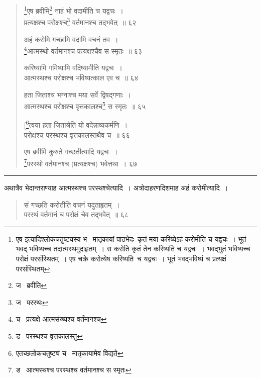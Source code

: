 \documentclass[11pt, openany]{book}
\begin{document}
{ 

\newpage

\lfoot{}

\begin{quote}
 {\na \renewcommand{\thefootnote}{1}\footnote{एष इत्यादिश्लोकचतुष्टयस्य भ \textendash\ मातृकायां पाठभेदः\textendash\ कृतं मया करिष्येऽहं करोमीति च यद्वचः~। भूतं भवद् भविष्यच्च तदात्मस्थमुदाहृतम्~। स करोति कृतं तेन करिष्यति च यद्वचः~। भवद्भुतं भविष्यच्च परोक्षं परसंस्थितम्~। एष चक्रे करोत्येष करिष्यति\textendash\ च यद्वचः~। भूतं भवद्भविष्यं च प्रत्यक्षं परसंस्थितम्}एष ब्रवीमि\renewcommand{\thefootnote}{2}\footnote{ज \textendash\ ब्रवीति} नाहं भो वदामीति च यद्वचः~। \\
प्रत्यक्षश्च परोक्षश्च\renewcommand{\thefootnote}{3}\footnote{ज \textendash\ परस्थः} वर्तमानश्च तद्भवेत्~॥ ६२ 

अहं करोमि गच्छामि वदामि वचनं तव~।\\ 
\renewcommand{\thefootnote}{4}\footnote{च \textendash\ प्रत्यक्षे आत्मसंख्यश्च वर्तंमानश्च }आत्मस्थो वर्तमानश्च प्रत्यक्षश्चैव स स्मृतः~॥ ६३ 

करिष्यामि गमिष्यामि वदिष्यामीति यद्वचः~। \\
आत्मस्थश्च परोक्षश्च भविष्यत्काल एव च~॥ ६४ 

हता जिताश्च भग्नाश्च मया सर्वे द्विषद्गणाः~। \\
आत्मस्थश्च परोक्षश्च वृत्तकालश्च\renewcommand{\thefootnote}{5}\footnote{ड \textendash\ परस्थश्च वृत्तकालस्तु} स स्मृतः~॥ ६५ 

[\renewcommand{\thefootnote}{6}\footnote{एतच्छलोकचतुष्ट्यं च \textendash\ मातृकायामेव विद्यते}त्वया हता जिताश्रेति यो वदेन्नाव्यकर्मणि~।\\ 
परोक्षश्च परस्थश्च वृत्तकालस्तथैव च~॥ ६६ 

एष ब्रवीमि कुरुते गच्छतीत्यादि यद्वचः~।\\ 
\renewcommand{\thefootnote}{7}\footnote{ड \textendash\ आत्भस्थश्च परस्थश्च वर्तमानश्च स स्मृतः }परस्थो वर्तमानश्च (प्रत्यक्षश्च) भवेत्तथा~। ६७ }
\end{quote}

\hrule

\vspace{2mm}

अथात्रैव भेदान्तराण्याह आत्मस्थश्च परस्थश्चेत्यादि~। अत्रोदाहरणदिशमाह अहं करोमीत्यादि~। 
\newpage

\begin{quote}
 {\na सं गच्छति करोतीति वचनं यदुताहृतम्~। \\
परस्थं वर्तमानं च परोक्षं चेव तद्भवेत्~॥ ६८ 

}
\end{quote}}
\end{document}
